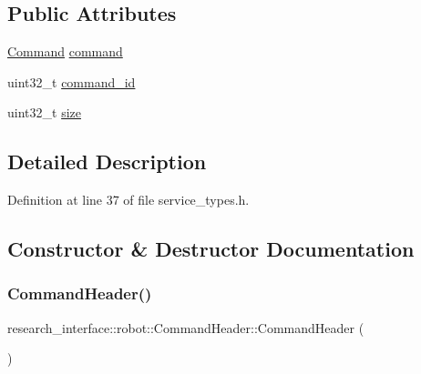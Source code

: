 \subsection*{Public Attributes}
\begin{DoxyCompactItemize}
\item 
\hyperlink{namespaceresearch__interface_1_1robot_a72624b344f0614e623ef21a53fb0aa50}{Command} \hyperlink{structresearch__interface_1_1robot_1_1CommandHeader_aad68e81f17365edd95d80c7f35684edc}{command}
\item 
uint32\+\_\+t \hyperlink{structresearch__interface_1_1robot_1_1CommandHeader_a915f5eddf273cb6279e817b2aa80a5bb}{command\+\_\+id}
\item 
uint32\+\_\+t \hyperlink{structresearch__interface_1_1robot_1_1CommandHeader_a1f4f17f7edc9169e3eb0ca7480d17b34}{size}
\end{DoxyCompactItemize}


\subsection{Detailed Description}


Definition at line 37 of file service\+\_\+types.\+h.



\subsection{Constructor \& Destructor Documentation}
\mbox{\label{structresearch__interface_1_1robot_1_1CommandHeader_a267aaad4b31ede9e092931f2b5e3ae89}} 
\subsubsection{\texorpdfstring{Command\+Header()}{CommandHeader()}\hspace{0.1cm}{\footnotesize\ttfamily [1/2]}}
{\footnotesize\ttfamily research\+\_\+interface\+::robot\+::\+Command\+Header\+::\+Command\+Header (\begin{DoxyParamCaption}{ }\end{DoxyParamCaption})\hspace{0.3cm}{\ttfamily [default]}}

